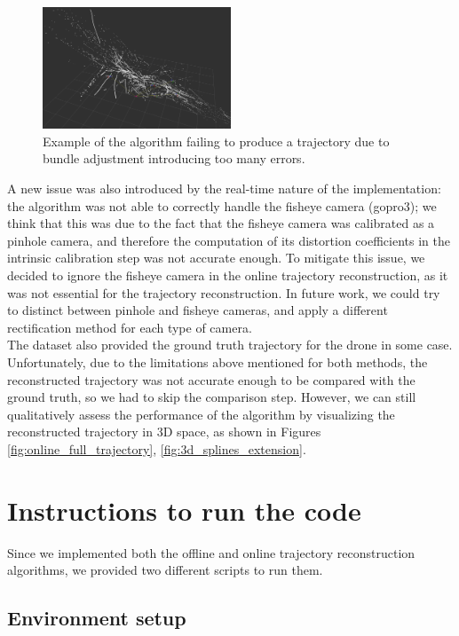 \documentclass[11pt]{article}
\begin{document}
\begin{figure}[h]
    \centering
    \includegraphics[width=0.5\textwidth]{imgs/online_failed_due_to_ba.png}
    \caption{Example of the algorithm failing to produce a trajectory due to bundle adjustment introducing too many errors.}
    \label{fig:bad_ba_online_failed}
\end{figure}

A new issue was also introduced by the real-time nature of the implementation: the algorithm was not able to correctly handle the fisheye camera (gopro3); we think that this was due to the fact that the fisheye camera was calibrated as a pinhole camera, and therefore the computation of its distortion coefficients in the intrinsic calibration step was not accurate enough. To mitigate this issue, we decided to ignore the fisheye camera in the online trajectory reconstruction, as it was not essential for the trajectory reconstruction. In future work, we could try to distinct between pinhole and fisheye cameras, and apply a different rectification method for each type of camera.\\

The dataset also provided the ground truth trajectory for the drone in some case. Unfortunately, due to the limitations above mentioned for both methods, the reconstructed trajectory was not accurate enough to be compared with the ground truth, so we had to skip the comparison step. However, we can still qualitatively assess the performance of the algorithm by visualizing the reconstructed trajectory in 3D space, as shown in Figures \ref{fig:online_full_trajectory}, \ref{fig:3d_splines_extension}.

\section{Instructions to run the code}

Since we implemented both the offline and online trajectory reconstruction algorithms, we provided two different scripts to run them.

\subsection{Environment setup}
\end{document}
